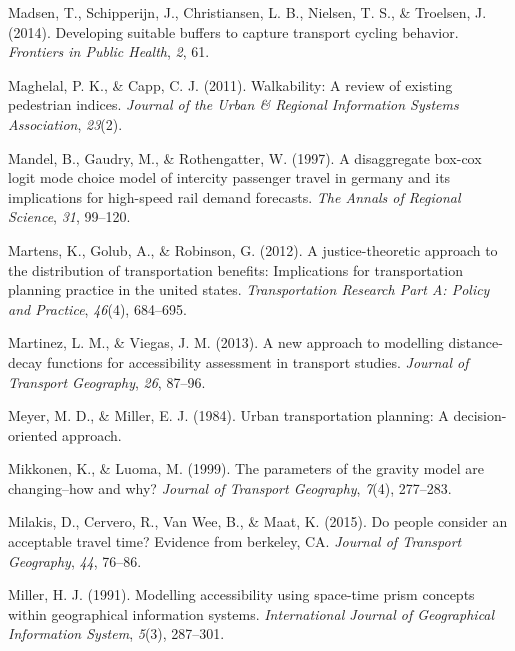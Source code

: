 \documentclass[
11pt, %
oneside, %
english, %
singlespacing, %
]{macthesis} %
\newlength{\cslhangindent}
\newenvironment{CSLReferences}[2] %
 {%
  \setlength{\parindent}{0pt}
  \ifodd #1 \everypar{\setlength{\hangindent}{\cslhangindent}}\ignorespaces\fi
  \ifnum #2 > 0
  \setlength{\parskip}{#2\baselineskip}
  \fi
 }%
 {}
\begin{document}
\begin{CSLReferences}{1}{0}
\leavevmode{}%
Madsen, T., Schipperijn, J., Christiansen, L. B., Nielsen, T. S., \& Troelsen, J. (2014). Developing suitable buffers to capture transport cycling behavior. \emph{Frontiers in Public Health}, \emph{2}, 61.

\leavevmode{}%
Maghelal, P. K., \& Capp, C. J. (2011). Walkability: A review of existing pedestrian indices. \emph{Journal of the Urban \& Regional Information Systems Association}, \emph{23}(2).

\leavevmode{}%
Mandel, B., Gaudry, M., \& Rothengatter, W. (1997). A disaggregate box-cox logit mode choice model of intercity passenger travel in germany and its implications for high-speed rail demand forecasts. \emph{The Annals of Regional Science}, \emph{31}, 99--120.

\leavevmode{}%
Martens, K., Golub, A., \& Robinson, G. (2012). A justice-theoretic approach to the distribution of transportation benefits: Implications for transportation planning practice in the united states. \emph{Transportation Research Part A: Policy and Practice}, \emph{46}(4), 684--695.

\leavevmode{}%
Martinez, L. M., \& Viegas, J. M. (2013). A new approach to modelling distance-decay functions for accessibility assessment in transport studies. \emph{Journal of Transport Geography}, \emph{26}, 87--96.

\leavevmode{}%
Meyer, M. D., \& Miller, E. J. (1984). Urban transportation planning: A decision-oriented approach.

\leavevmode{}%
Mikkonen, K., \& Luoma, M. (1999). The parameters of the gravity model are changing--how and why? \emph{Journal of Transport Geography}, \emph{7}(4), 277--283.

\leavevmode{}%
Milakis, D., Cervero, R., Van Wee, B., \& Maat, K. (2015). Do people consider an acceptable travel time? Evidence from berkeley, CA. \emph{Journal of Transport Geography}, \emph{44}, 76--86.

\leavevmode{}%
Miller, H. J. (1991). Modelling accessibility using space-time prism concepts within geographical information systems. \emph{International Journal of Geographical Information System}, \emph{5}(3), 287--301.


\end{CSLReferences}
\end{document}
